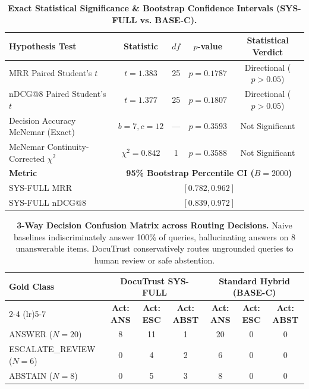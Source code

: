 \begin{table}[h]
\centering
\small
\begin{tabular}{lcccc}
\toprule
\textbf{Hypothesis Test} & \textbf{Statistic} & \textbf{$df$} & \textbf{$p$-value} & \textbf{Statistical Verdict} \\
\midrule
MRR Paired Student's $t$ & $t = 1.383$ & 25 & $p = 0.1787$ & Directional ($p > 0.05$) \\
nDCG@8 Paired Student's $t$ & $t = 1.377$ & 25 & $p = 0.1807$ & Directional ($p > 0.05$) \\
Decision Accuracy McNemar (Exact) & $b=7, c=12$ & --- & $p = 0.3593$ & Not Significant \\
McNemar Continuity-Corrected $\chi^2$ & $\chi^2 = 0.842$ & 1 & $p = 0.3588$ & Not Significant \\
\midrule
\textbf{Metric} & \multicolumn{4}{c}{\textbf{95\% Bootstrap Percentile CI ($B=2000$)}} \\
\midrule
SYS-FULL MRR & \multicolumn{4}{c}{$[0.782, 0.962]$} \\
SYS-FULL nDCG@8 & \multicolumn{4}{c}{$[0.839, 0.972]$} \\
\bottomrule
\end{tabular}
\caption{\textbf{Exact Statistical Significance & Bootstrap Confidence Intervals (SYS-FULL vs. BASE-C).}}
\label{tab:statistical_tests}
\end{table}

\begin{table}[h]
\centering
\small
\begin{tabular}{lcccccc}
\toprule
\multirow{2}{*}{\textbf{Gold Class}} & \multicolumn{3}{c}{\textbf{DocuTrust SYS-FULL}} & \multicolumn{3}{c}{\textbf{Standard Hybrid (BASE-C)}} \\
\cmidrule(lr){2-4} \cmidrule(lr){5-7}
 & \textbf{Act: ANS} & \textbf{Act: ESC} & \textbf{Act: ABST} & \textbf{Act: ANS} & \textbf{Act: ESC} & \textbf{Act: ABST} \\
\midrule
ANSWER ($N=20$)            & 8 & 11 & 1 & 20 & 0 & 0 \\
ESCALATE\_REVIEW ($N=6$)   & 0 & 4  & 2 & 6  & 0 & 0 \\
ABSTAIN ($N=8$)            & 0 & 5  & 3 & 8  & 0 & 0 \\
\bottomrule
\end{tabular}
\caption{\textbf{3-Way Decision Confusion Matrix across Routing Decisions.} Naive baselines indiscriminately answer 100\% of queries, hallucinating answers on 8 unanswerable items. DocuTrust conservatively routes ungrounded queries to human review or safe abstention.}
\label{tab:confusion_matrix}
\end{table}
